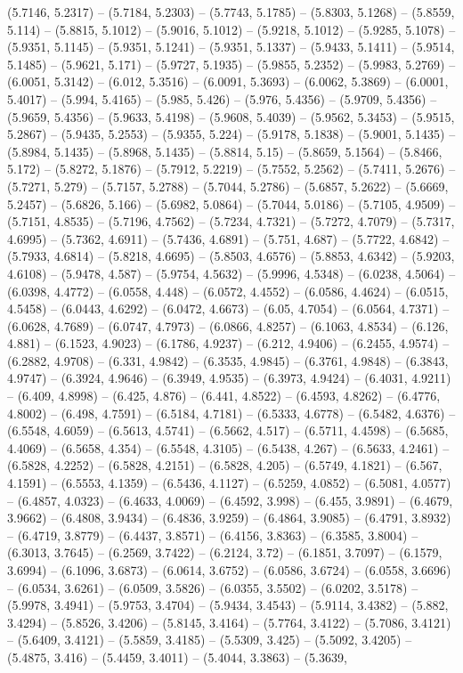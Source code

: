 (5.7146, 5.2317) -- (5.7184, 5.2303) -- (5.7743, 5.1785) -- (5.8303, 5.1268) -- (5.8559, 5.114) -- (5.8815, 5.1012) -- (5.9016, 5.1012) -- (5.9218, 5.1012) -- (5.9285, 5.1078) -- (5.9351, 5.1145) -- (5.9351, 5.1241) -- (5.9351, 5.1337) -- (5.9433, 5.1411) -- (5.9514, 5.1485) -- (5.9621, 5.171) -- (5.9727, 5.1935) -- (5.9855, 5.2352) -- (5.9983, 5.2769) -- (6.0051, 5.3142) -- (6.012, 5.3516) -- (6.0091, 5.3693) -- (6.0062, 5.3869) -- (6.0001, 5.4017) -- (5.994, 5.4165) -- (5.985, 5.426) -- (5.976, 5.4356) -- (5.9709, 5.4356) -- (5.9659, 5.4356) -- (5.9633, 5.4198) -- (5.9608, 5.4039) -- (5.9562, 5.3453) -- (5.9515, 5.2867) -- (5.9435, 5.2553) -- (5.9355, 5.224) -- (5.9178, 5.1838) -- (5.9001, 5.1435) -- (5.8984, 5.1435) -- (5.8968, 5.1435) -- (5.8814, 5.15) -- (5.8659, 5.1564) -- (5.8466, 5.172) -- (5.8272, 5.1876) -- (5.7912, 5.2219) -- (5.7552, 5.2562) -- (5.7411, 5.2676) -- (5.7271, 5.279) -- (5.7157, 5.2788) -- (5.7044, 5.2786) -- (5.6857, 5.2622) -- (5.6669, 5.2457) -- (5.6826, 5.166) -- (5.6982, 5.0864) -- (5.7044, 5.0186) -- (5.7105, 4.9509) -- (5.7151, 4.8535) -- (5.7196, 4.7562) -- (5.7234, 4.7321) -- (5.7272, 4.7079) -- (5.7317, 4.6995) -- (5.7362, 4.6911) -- (5.7436, 4.6891) -- (5.751, 4.687) -- (5.7722, 4.6842) -- (5.7933, 4.6814) -- (5.8218, 4.6695) -- (5.8503, 4.6576) -- (5.8853, 4.6342) -- (5.9203, 4.6108) -- (5.9478, 4.587) -- (5.9754, 4.5632) -- (5.9996, 4.5348) -- (6.0238, 4.5064) -- (6.0398, 4.4772) -- (6.0558, 4.448) -- (6.0572, 4.4552) -- (6.0586, 4.4624) -- (6.0515, 4.5458) -- (6.0443, 4.6292) -- (6.0472, 4.6673) -- (6.05, 4.7054) -- (6.0564, 4.7371) -- (6.0628, 4.7689) -- (6.0747, 4.7973) -- (6.0866, 4.8257) -- (6.1063, 4.8534) -- (6.126, 4.881) -- (6.1523, 4.9023) -- (6.1786, 4.9237) -- (6.212, 4.9406) -- (6.2455, 4.9574) -- (6.2882, 4.9708) -- (6.331, 4.9842) -- (6.3535, 4.9845) -- (6.3761, 4.9848) -- (6.3843, 4.9747) -- (6.3924, 4.9646) -- (6.3949, 4.9535) -- (6.3973, 4.9424) -- (6.4031, 4.9211) -- (6.409, 4.8998) -- (6.425, 4.876) -- (6.441, 4.8522) -- (6.4593, 4.8262) -- (6.4776, 4.8002) -- (6.498, 4.7591) -- (6.5184, 4.7181) -- (6.5333, 4.6778) -- (6.5482, 4.6376) -- (6.5548, 4.6059) -- (6.5613, 4.5741) -- (6.5662, 4.517) -- (6.5711, 4.4598) -- (6.5685, 4.4069) -- (6.5658, 4.354) -- (6.5548, 4.3105) -- (6.5438, 4.267) -- (6.5633, 4.2461) -- (6.5828, 4.2252) -- (6.5828, 4.2151) -- (6.5828, 4.205) -- (6.5749, 4.1821) -- (6.567, 4.1591) -- (6.5553, 4.1359) -- (6.5436, 4.1127) -- (6.5259, 4.0852) -- (6.5081, 4.0577) -- (6.4857, 4.0323) -- (6.4633, 4.0069) -- (6.4592, 3.998) -- (6.455, 3.9891) -- (6.4679, 3.9662) -- (6.4808, 3.9434) -- (6.4836, 3.9259) -- (6.4864, 3.9085) -- (6.4791, 3.8932) -- (6.4719, 3.8779) -- (6.4437, 3.8571) -- (6.4156, 3.8363) -- (6.3585, 3.8004) -- (6.3013, 3.7645) -- (6.2569, 3.7422) -- (6.2124, 3.72) -- (6.1851, 3.7097) -- (6.1579, 3.6994) -- (6.1096, 3.6873) -- (6.0614, 3.6752) -- (6.0586, 3.6724) -- (6.0558, 3.6696) -- (6.0534, 3.6261) -- (6.0509, 3.5826) -- (6.0355, 3.5502) -- (6.0202, 3.5178) -- (5.9978, 3.4941) -- (5.9753, 3.4704) -- (5.9434, 3.4543) -- (5.9114, 3.4382) -- (5.882, 3.4294) -- (5.8526, 3.4206) -- (5.8145, 3.4164) -- (5.7764, 3.4122) -- (5.7086, 3.4121) -- (5.6409, 3.4121) -- (5.5859, 3.4185) -- (5.5309, 3.425) -- (5.5092, 3.4205) -- (5.4875, 3.416) -- (5.4459, 3.4011) -- (5.4044, 3.3863) -- (5.3639, 